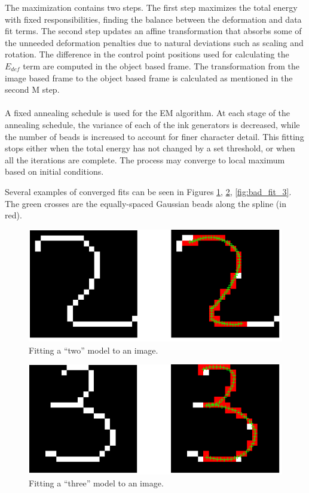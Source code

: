 \documentclass[oribibl]{llncs}
\begin{document}
The maximization contains two steps. The first step maximizes the total energy with fixed responsibilities, finding the balance between the deformation and data fit terms. The second step updates an affine transformation that absorbs some of the unneeded deformation penalties due to natural deviations such as scaling and rotation. The difference in the control point positions used for calculating the $E_{def}$ term are computed in the object based frame. The transformation from the image based frame to the object based frame is calculated as mentioned in the second M step.
\\
\\
A fixed annealing schedule is used for the EM algorithm. At each stage of the annealing schedule, the variance of each of the ink generators is decreased, while the number of beads is increased to account for finer character detail. This fitting stops either when the total energy has not changed by a set threshold, or when all the iterations are complete. The process may converge to local maximum based on initial conditions.

Several examples of converged fits can be seen in Figures \ref{fig:good_fit_2}, \ref{fig:good_fit_3}, \ref{fig:bad_fit_3}.
The green crosses are the equally-spaced Gaussian beads along the spline (in red).

\begin{figure}
\centering
\includegraphics[width=.7\linewidth]{figs/good_fit_2.png}
\caption{Fitting a ``two'' model to an image.}
\label{fig:good_fit_2}
\end{figure}

\begin{figure}
\centering
\includegraphics[width=.7\linewidth]{figs/good_fit_3.png}
\caption{Fitting a ``three'' model to an image.}
\label{fig:good_fit_3}
\end{figure}
\end{document}
